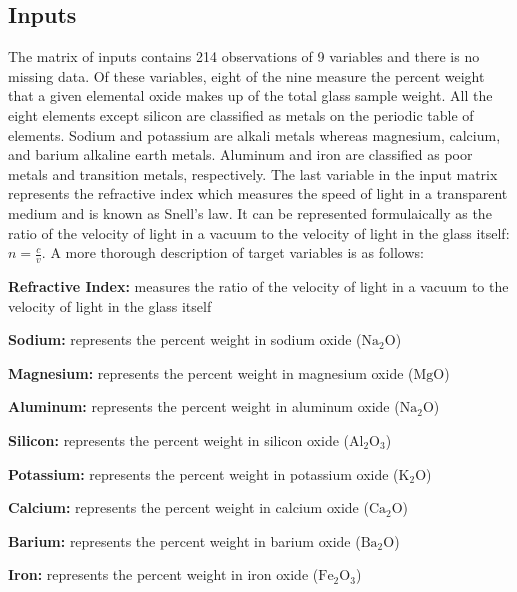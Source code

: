 \documentclass[12pt,halfline,a4paper]{ouparticle}
\begin{document}
\subsection{Inputs}
\label{sec3.1}
The matrix of inputs contains 214 observations of 9 variables and there is no missing data. Of these variables, eight of the nine measure the percent weight that a given elemental oxide makes up of the total glass sample weight. All the eight elements except silicon are classified as metals on the periodic table of elements. Sodium and potassium are alkali metals whereas magnesium, calcium, and barium alkaline earth metals. Aluminum and iron are classified as poor metals and transition metals, respectively. The last variable in the input matrix represents the refractive index which measures the speed of light in a transparent medium and is known as Snell's law. It can be represented formulaically as the ratio of the velocity of light in a vacuum to the velocity of light in the glass itself: $n = \frac{c}{v}$. A more thorough description of target variables is as follows: 
\begin{description}
\item \textbf{Refractive Index:}
measures the ratio of the velocity of light in a vacuum to the velocity of light in the glass itself
\item \textbf{Sodium:}
represents the percent weight in sodium oxide ($\mathrm{Na_{2}O}$)
\item \textbf{Magnesium:}
represents the percent weight in magnesium oxide ($\mathrm{MgO}$)
\item \textbf{Aluminum:}
represents the percent weight in aluminum oxide ($\mathrm{Na_{2}O}$)
\item \textbf{Silicon:}
represents the percent weight in silicon oxide ($\mathrm{Al_{2}O_{3}}$)
\item \textbf{Potassium:}
represents the percent weight in potassium oxide ($\mathrm{K_{2}O}$)
\item \textbf{Calcium:}
represents the percent weight in calcium oxide ($\mathrm{Ca_{2}O}$)
\item \textbf{Barium:}
represents the percent weight in barium oxide ($\mathrm{Ba_{2}O}$)
\item \textbf{Iron:}
represents the percent weight in iron oxide ($\mathrm{Fe_{2}O_{3}}$)
\end{description}
\end{document}
